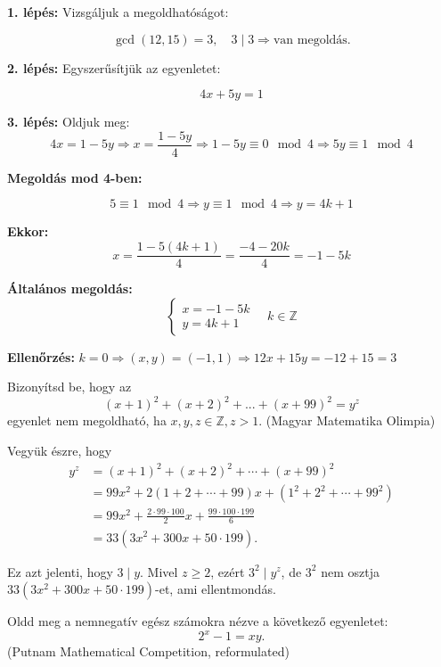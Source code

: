 \begin{solution}
	\textbf{1. lépés:} Vizsgáljuk a megoldhatóságot:
	
	\[
	\gcd(12,15)=3,\quad3\mid3\Rightarrow\text{van megoldás.}
	\]
	
	\textbf{2. lépés:} Egyszerűsítjük az egyenletet:
	
	\[
	4x+5y=1
	\]
	
	\textbf{3. lépés:} Oldjuk meg: 
	\[
	4x=1-5y\Rightarrow x=\frac{1-5y}{4}\Rightarrow1-5y\equiv0\mod 4\Rightarrow5y\equiv1\mod 4
	\]
	
	\textbf{Megoldás mod 4-ben:}
	
	\[
	5\equiv1\mod 4\Rightarrow y\equiv1\mod 4\Rightarrow y=4k+1
	\]
	
	\textbf{Ekkor:} 
	\[
	x=\frac{1-5(4k+1)}{4}=\frac{-4-20k}{4}=-1-5k
	\]
	
	\textbf{Általános megoldás:}
	\[
	\boxed{\begin{cases}
			x=-1-5k\\
			y=4k+1
		\end{cases}\quad k\in\mathbb{Z}}
	\]
	
	\textbf{Ellenőrzés:}
	$k=0\Rightarrow(x,y)=(-1,1)\Rightarrow12x+15y=-12+15=3$
\end{solution}
\begin{problem}
	Bizonyítsd be, hogy az 
	\[
	(x+1)^{2}+(x+2)^{2}+...+(x+99)^{2}=y^{z}
	\]
	egyenlet nem megoldható, ha $x,y,z\in\mathbb{Z},z>1$. (Magyar Matematika
	Olimpia) 
\end{problem}

\begin{solution}
	Vegyük észre, hogy 
	\begin{align*}
		y^{z} & =(x+1)^{2}+(x+2)^{2}+\cdots+(x+99)^{2}\\
		& =99x^{2}+2(1+2+\cdots+99)x+(1^{2}+2^{2}+\cdots+99^{2})\\
		& =99x^{2}+\frac{2\cdot99\cdot100}{2}x+\frac{99\cdot100\cdot199}{6}\\
		& =33(3x^{2}+300x+50\cdot199).
	\end{align*}
	
	Ez azt jelenti, hogy $3\mid y$. Mivel $z\geq2$, ezért $3^{2}\mid y^{z}$,
	de $3^{2}$ nem osztja $33(3x^{2}+300x+50\cdot199)$-et, ami ellentmondás.
\end{solution}
\begin{problem}
	Oldd meg a nemnegatív egész számokra nézve a következő egyenletet:
	\[
	2^{x}-1=xy.
	\]
	(Putnam Mathematical Competition, reformulated) 
\end{problem}

